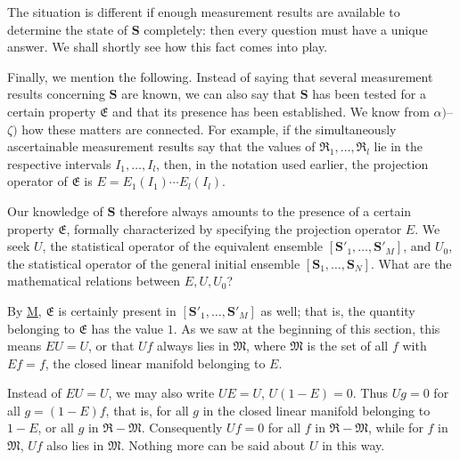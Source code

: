 \documentclass[fontsize=13pt,twoside,openany,headings=normal,parskip=false,bookmarkpackage=false,DIV=calc]{scrbook}
\begin{document}
The situation is different if enough measurement results are available to determine the state of $\boldsymbol{S}$ completely: then every question must have a unique answer. We shall shortly see how this fact comes into play.

Finally, we mention the following. Instead of saying that several measurement results concerning $\boldsymbol{S}$ are known, we can also say that $\boldsymbol{S}$ has been tested for a certain property $\mathfrak E$ and that its presence
\hypertarget{origpage-180}{}%
has been established. We know from \hyperref[post:III.5.alpha]{$\alpha)$}--\hyperref[post:III.5.zeta]{$\zeta)$} how these matters are connected. For example, if the simultaneously ascertainable measurement results say that the values of $\mathfrak R_1,\ldots,\mathfrak R_l$ lie in the respective intervals $I_1,\ldots,I_l$, then, in the notation used earlier, the projection operator of $\mathfrak E$ is $E=E_1(I_1)\cdots E_l(I_l)$.

Our knowledge of $\boldsymbol{S}$ therefore always amounts to the presence of a certain property $\mathfrak E$, formally characterized by specifying the projection operator $E$. We seek $U$, the statistical operator of the equivalent ensemble $[\boldsymbol{S}'_1,\ldots,\boldsymbol{S}'_M]$, and $U_0$, the statistical operator of the general initial ensemble $[\boldsymbol{S}_1,\ldots,\boldsymbol{S}_N]$. What are the mathematical relations between $E,U,U_0$?

By \hyperref[post:IV.3.M]{M}, $\mathfrak E$ is certainly present in $[\boldsymbol{S}'_1,\ldots,\boldsymbol{S}'_M]$ as well; that is, the quantity belonging to $\mathfrak E$ has the value $1$. As we saw at the beginning of this section, this means $EU=U$, or that $Uf$ always lies in $\mathfrak M$, where $\mathfrak M$ is the set of all $f$ with $Ef=f$, the closed linear manifold belonging to $E$.

Instead of $EU=U$, we may also write $UE=U$, $U(1-E)=0$. Thus $Ug=0$ for all $g=(1-E)f$, that is, for all $g$ in the closed linear manifold belonging to $1-E$, or all $g$ in $\mathfrak R-\mathfrak M$. Consequently $Uf=0$ for all $f$ in $\mathfrak R-\mathfrak M$, while for $f$ in $\mathfrak M$, $Uf$ also lies in $\mathfrak M$. Nothing more can be said about $U$ in this way.
\end{document}
